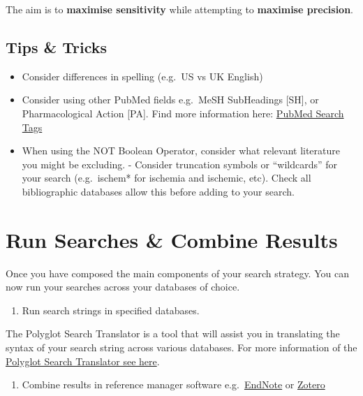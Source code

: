 \documentclass[
]{book}
\providecommand{\tightlist}{%
  \setlength{\itemsep}{0pt}\setlength{\parskip}{0pt}}
\begin{document}
The aim is to \textbf{maximise sensitivity} while attempting to \textbf{maximise precision}.

\hypertarget{tips-tricks}{%
\subsection{Tips \& Tricks}\label{tips-tricks}}

\begin{itemize}
\tightlist
\item
  Consider differences in spelling (e.g.~US vs UK English)
\item
  Consider using other PubMed fields e.g.~MeSH SubHeadings {[}SH{]}, or Pharmacological Action {[}PA{]}. Find more information here: \href{https://pubmed.ncbi.nlm.nih.gov/help/\#search-tags}{PubMed Search Tags}
\item
  When using the NOT Boolean Operator, consider what relevant literature you might be excluding. - Consider truncation symbols or ``wildcards'' for your search (e.g.~ischem* for ischemia and ischemic, etc). Check all bibliographic databases allow this before adding to your search.
\end{itemize}

\hypertarget{run-searches-combine-results}{%
\section{Run Searches \& Combine Results}\label{run-searches-combine-results}}

Once you have composed the main components of your search strategy. You can now run your searches across your databases of choice.

\begin{enumerate}
\def\labelenumi{\arabic{enumi}.}
\tightlist
\item
  Run search strings in specified databases.
\end{enumerate}

The Polyglot Search Translator is a tool that will assist you in translating the syntax of your search string across various databases. For more information of the \href{https://sr-accelerator.com/\#/polyglot}{Polyglot Search Translator see here}.

\begin{enumerate}
\def\labelenumi{\arabic{enumi}.}
\setcounter{enumi}{1}
\tightlist
\item
  Combine results in reference manager software e.g.~\href{https://endnote.com/}{EndNote} or \href{https://www.zotero.org/}{Zotero}
\end{enumerate}
\end{document}
